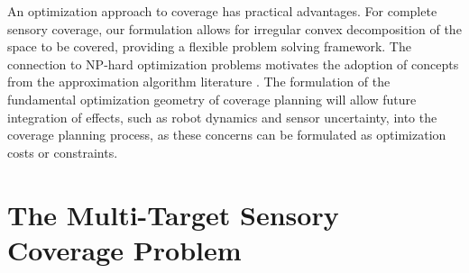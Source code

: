 \documentclass[letterpaper, 10 pt, conference]{ieeeconf}
\theoremstyle{definition}
\begin{document}
An optimization approach to coverage has practical advantages.  For complete sensory coverage, our formulation allows for irregular convex
decomposition of the space to be covered, providing a flexible problem solving framework. The connection to NP-hard optimization problems motivates the adoption of concepts from the approximation algorithm literature \cite{arkin_approximation_1994}.  The formulation of the fundamental optimization geometry of coverage planning will allow future integration of effects, such as robot dynamics and sensor uncertainty, into the coverage planning process, as these concerns can be formulated as optimization costs or constraints.


\section{The Multi-Target Sensory Coverage Problem }\label{sec:covering_path}
\end{document}
